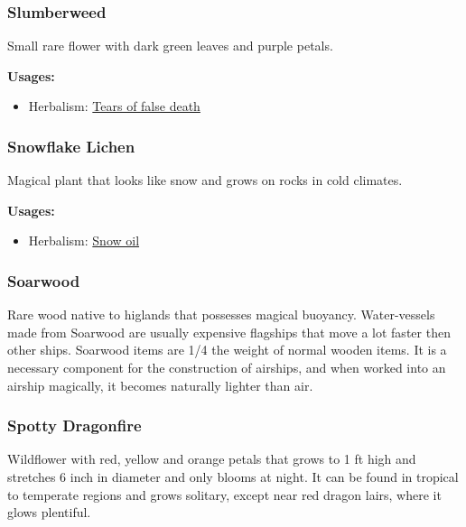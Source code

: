 \subsubsection{Slumberweed}
\label{Slumberweed}

Small rare flower with dark green leaves and purple petals.

\vspace{5mm}

\textbf{Usages:}

\begin{itemize}[noitemsep]
\item[] Herbalism: \hyperref[Tears of false death]{Tears of false death}
\end{itemize}

\subsubsection{Snowflake Lichen}
\label{Snowflake Lichen}

Magical plant that looks like snow and grows on rocks in cold climates.

\vspace{5mm}

\textbf{Usages:}

\begin{itemize}[noitemsep]
\item[] Herbalism: \hyperref[Snow oil]{Snow oil}
\end{itemize}

\subsubsection{Soarwood}

Rare wood native to higlands that possesses magical buoyancy. Water-vessels made from Soarwood are usually expensive flagships that move a lot faster then other ships. Soarwood items are 1/4 the weight of normal wooden items. It is a necessary component for the construction of airships, and when worked into an airship magically, it becomes naturally lighter than air.

\subsubsection{Spotty Dragonfire}
\label{Spotty Dragonfire}

Wildflower with red, yellow and orange petals that grows to 1 ft high and stretches 6 inch in diameter and only blooms at night. It can be found in tropical to temperate regions and grows solitary, except near red dragon lairs, where it glows plentiful.

